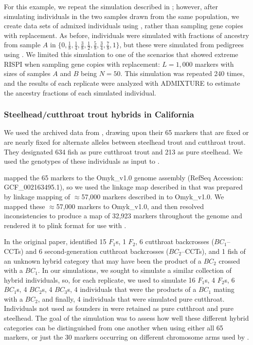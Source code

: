 {For this example, we repeat the simulation described in {\em {}};
however, after simulating individuals in the two samples drawn from the same population,
we create data sets of admixed individuals using \gscramble{}, rather than sampling
gene copies with replacement.  As before, individuals were simulated with fractions of
ancestry from sample $A$ in $\{0, \frac{1}{8}, \frac{1}{4}, \frac{3}{8}, \frac{1}{2}, \frac{5}{8}, \frac{3}{4}, \frac{7}{8}, 1\}$, but these were simulated from pedigrees using \gscramble{}.  We limited
this simulation to one of the scenarios that showed extreme RISPI when sampling gene
copies with replacement: $L=1,000$ markers with sizes of samples $A$ and $B$ being
$N=50$. This simulation was repeated 240 times, and the results of each replicate were analyzed with
ADMIXTURE to estimate the ancestry fractions of each simulated individual.

\subsubsection*{Steelhead/cutthroat trout hybrids in California}

We used the archived data from \citet{rizza2023limited}, drawing upon their 65 markers
that are fixed or are nearly fixed for alternate alleles between steelhead trout and cutthroat trout.
They designated 634 fish as pure cutthroat trout and 213 as pure steelhead.  We used the
genotypes of these individuals as input to \gscramble{}.

\citeauthor{rizza2023limited} mapped the 65 markers to the Omyk\_v1.0 genome assembly (RefSeq 
Accession: GCF\_002163495.1), so we used
the linkage map described in \citep{pearse2019sex} that was prepared by linkage mapping 
of $\approx$57,000 markers described in \citet{palti2015development} to Omyk\_v1.0. We mapped these $\approx$57,000 markers to Omyk\_v1.0, and then resolved inconsistencies to produce a map
of 32,923 markers throughout the genome and rendered it to plink format for use with \gscramble{}.

In the original paper, \citet{rizza2023limited} identified 15 $F_1$s,
1 $F_2$,
6 cutthroat backcrosses ($BC_1$--CCTs) and 
6 second-generation cutthroat backcrosses ($BC_2$--CCTs),
and 1 fish of an unknown hybrid category that may have been the
product of a $BC_2$ crossed with a $BC_1$.   In our simulations, we sought to simulate
a similar collection of hybrid individuals, so, for each replicate, we used
\gscramble{} to simulate 16 $F_1$s, 4 $F_2$s, 6 $BC_1$s, 4 $BC_2$s, 4 $BC_3$s,  4 individuals
that were the products of a $BC_1$ mating with a $BC_2$, and finally, 4 individuals that were simulated pure cutthroat. Individuals not used as founders
in \gscramble{} were retained as pure cutthroat and pure steelhead.  The goal of the simulation
was to assess how well these different hybrid categories can be distinguished from one another
when using either all 65 markers, or just the 30 markers occurring on different chromosome arms
used by  \citet{rizza2023limited}.

}
